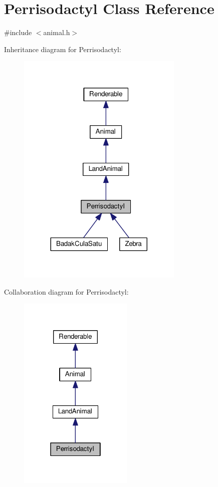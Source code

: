 \hypertarget{classPerrisodactyl}{}\section{Perrisodactyl Class Reference}
\label{classPerrisodactyl}


{\ttfamily \#include $<$animal.\+h$>$}



Inheritance diagram for Perrisodactyl\+:
\nopagebreak
\begin{figure}[H]
\begin{center}
\leavevmode
\includegraphics[width=224pt]{classPerrisodactyl__inherit__graph}
\end{center}
\end{figure}


Collaboration diagram for Perrisodactyl\+:
\nopagebreak
\begin{figure}[H]
\begin{center}
\leavevmode
\includegraphics[width=154pt]{classPerrisodactyl__coll__graph}
\end{center}
\end{figure}
